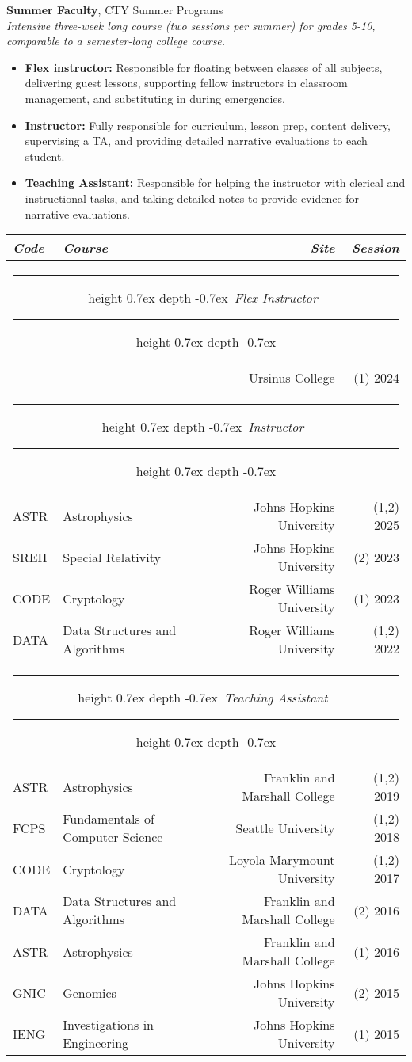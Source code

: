 \documentclass[marginmode, 10pt]{res} %
\def\Vhrulefill{\leavevmode\leaders\hrule height 0.7ex depth \dimexpr0.4pt-0.7ex\hfill\kern0pt}         %
\begin{document}
\begin{resume}
\textbf{Summer Faculty}, CTY Summer Programs \\
\textit{Intensive three-week long course (two sessions per summer) for grades 5-10, comparable to a semester-long college course.}
\begin{itemize}
    \item \textbf{Flex instructor:} Responsible for floating between classes of all subjects, delivering guest lessons, supporting fellow instructors in classroom management, and substituting in during emergencies.
    \item \textbf{Instructor:} Fully responsible for curriculum, lesson prep, content delivery, supervising a TA, and providing detailed narrative evaluations to each student.
    \item \textbf{Teaching Assistant:} Responsible for helping the instructor with clerical and instructional tasks, and taking detailed notes to provide evidence for narrative evaluations.
\end{itemize}
\begin{tabular*}{\textwidth}{ll@{\extracolsep{\fill}}rr}
    \textit{Code} & \textit{Course} & \textit{Site} & \textit{Session} \\
    \hline
    \multicolumn{4}{c}{\Vhrulefill ~\textit{Flex Instructor}~ \Vhrulefill} \\
    & & Ursinus College & (1) 2024 \\
    \multicolumn{4}{c}{\Vhrulefill ~\textit{Instructor}~ \Vhrulefill} \\
    ASTR & Astrophysics & Johns Hopkins University & (1,2) 2025 \\
    SREH & Special Relativity & Johns Hopkins University & (2) 2023 \\
    CODE & Cryptology & Roger Williams University & (1) 2023 \\
    DATA & Data Structures and Algorithms & Roger Williams University & (1,2) 2022 \\
    \multicolumn{4}{c}{\Vhrulefill ~\textit{Teaching Assistant}~ \Vhrulefill} \\
    ASTR & Astrophysics & Franklin and Marshall College & (1,2) 2019 \\
    FCPS & Fundamentals of Computer Science & Seattle University & (1,2) 2018 \\
    CODE & Cryptology & Loyola Marymount University & (1,2) 2017 \\
    DATA & Data Structures and Algorithms & Franklin and Marshall College & (2) 2016 \\
    ASTR & Astrophysics & Franklin and Marshall College & (1) 2016 \\
    GNIC & Genomics & Johns Hopkins University & (2) 2015 \\
    IENG & Investigations in Engineering & Johns Hopkins University & (1) 2015
\end{tabular*}


\end{resume}
\end{document}
